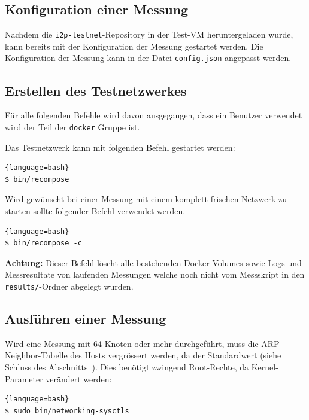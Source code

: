 \subsection{Konfiguration einer Messung}

Nachdem die \lstinline|i2p-testnet|-Repository in der Test-VM heruntergeladen wurde, kann bereits mit der Konfiguration der Messung gestartet werden.
Die Konfiguration der Messung kann in der Datei \lstinline|config.json| angepasst werden.

\subsection{Erstellen des Testnetzwerkes}\label{sec:erstellen_des_testnetzwerks}

Für alle folgenden Befehle wird davon ausgegangen, dass ein Benutzer verwendet wird der Teil der \lstinline|docker| Gruppe ist.

Das Testnetzwerk kann mit folgenden Befehl gestartet werden:

\begin{lstlisting}[numbers=none]{language=bash}
$ bin/recompose
\end{lstlisting}

Wird gewünscht bei einer Messung mit einem komplett frischen Netzwerk zu starten
sollte folgender Befehl verwendet werden.

\begin{lstlisting}[numbers=none]{language=bash}
$ bin/recompose -c
\end{lstlisting}

\textbf{Achtung:} Dieser Befehl löscht alle bestehenden Docker-Volumes sowie Logs und Messresultate von laufenden Messungen welche noch nicht vom Messskript in den \lstinline|results/|-Ordner abgelegt wurden.

\subsection{Ausführen einer Messung}

Wird eine Messung mit 64 Knoten oder mehr durchgeführt, muss die ARP-Neighbor-Tabelle des Hosts vergrössert werden, da der Standardwert  (siehe Schluss des Abschnitts~). Dies benötigt zwingend Root-Rechte, da Kernel-Parameter verändert werden:

\begin{lstlisting}[numbers=none]{language=bash}
$ sudo bin/networking-sysctls
\end{lstlisting}

